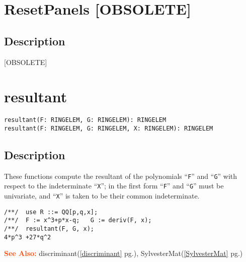 \documentclass[a4paper]{mybook}
\newenvironment{command}{}{} %
\newcommand\SeeAlso{\par\textcolor{OrangeRed}{\textbf{\large See Also: }}}
\begin{document}
\section{ResetPanels [OBSOLETE]}
\label{ResetPanels [OBSOLETE]}
\begin{command} %



\subsection*{Description}

[OBSOLETE]

\end{command} %

\section{resultant}
\label{resultant}
\begin{command} %


\begin{Verbatim}[label=syntax, rulecolor=\color{MidnightBlue},
frame=single]
resultant(F: RINGELEM, G: RINGELEM): RINGELEM
resultant(F: RINGELEM, G: RINGELEM, X: RINGELEM): RINGELEM
\end{Verbatim}


\subsection*{Description}

These functions compute the resultant of the polynomials ``\verb&F&'' and ``\verb&G&'' with
respect to the indeterminate ``\verb&X&''; in the first form ``\verb&F&'' and ``\verb&G&''
must be univariate, and ``\verb&X&'' is taken to be their common indeterminate. 
\begin{Verbatim}[label=example, rulecolor=\color{PineGreen}, frame=single]
/**/  use R ::= QQ[p,q,x];
/**/  F := x^3+p*x-q;   G := deriv(F, x);
/**/  resultant(F, G, x);
4*p^3 +27*q^2
\end{Verbatim}


\SeeAlso %
  discriminant(\ref{discriminant} pg.\pageref{discriminant}), 
    SylvesterMat(\ref{SylvesterMat} pg.\pageref{SylvesterMat})
\end{command} %
\end{document}
